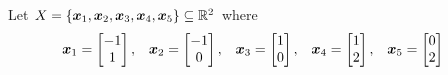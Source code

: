             \begin{Example}
            Let \(X=\left\{\bm{x}_1, \bm{x}_2, \bm{x}_3, \bm{x}_4, \bm{x}_5\right\}\subseteq\mathbb{R}^{2}\) where
                \begin{align*}
                    \bm{x}_1
                        &=  \begin{bmatrix}
                                -1\\ 1
                            \end{bmatrix},&
                    \bm{x}_2
                        &=  \begin{bmatrix}
                                -1\\ 0
                            \end{bmatrix},&
                    \bm{x}_3
                        &=  \begin{bmatrix}
                                1\\ 0
                            \end{bmatrix},&
                    \bm{x}_4
                        &=  \begin{bmatrix}
                                1\\ 2
                            \end{bmatrix},&
                    \bm{x}_5
                        &=  \begin{bmatrix}
                                0\\ 2
                            \end{bmatrix}
                \end{align*}

\end{Example}
